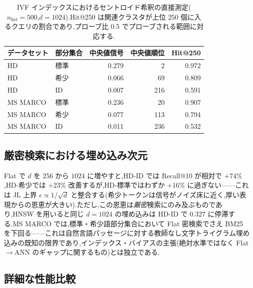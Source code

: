 \documentclass[conference]{IEEEtran}
\begin{document}
\begin{table}[t]
\centering
\small
\caption{IVF インデックスにおけるセントロイド希釈の直接測定($n_{\text{list}}{=}500$,$d{=}1024$).Hit@250 は関連クラスタが上位 $250$ 個に入るクエリの割合であり,プローブ比 $0.5$ でプローブされる範囲に対応する.}
\label{tab:centroid-stats}
\setlength{\tabcolsep}{4pt}
\begin{tabular}{llrrr}
\toprule
\textbf{データセット} & \textbf{部分集合} & \textbf{中央値信号} & \textbf{中央値順位} & \textbf{Hit@250} \\
\midrule
HD       & 標準   & 0.279 &   2 & 0.972 \\
HD       & 希少   & 0.066 &  69 & 0.809 \\
HD       & ID     & 0.007 & 216 & 0.591 \\
\midrule
MS MARCO & 標準   & 0.236 &  20 & 0.907 \\
MS MARCO & 希少   & 0.077 & 113 & 0.794 \\
MS MARCO & ID     & 0.011 & 236 & 0.532 \\
\bottomrule
\end{tabular}
\end{table}

\subsection{厳密検索における埋め込み次元}

Flat で $d$ を $256$ から $1024$ に増やすと,HD-ID では Recall@10 が相対で $+74\%$,HD-希少では $+23\%$ 改善するが,HD-標準ではわずか $+16\%$ に過ぎない——これは JL 上界 $\epsilon\!\propto\!1/\sqrt{d}$ と整合する(希少トークンは信号がノイズ床に近く,厚い表現からの恩恵が大きい).ただし,この恩恵は\emph{厳密}検索にのみ及ぶものであり,HNSW を用いると同じ $d{=}1024$ の埋め込みは HD-ID で $0.327$ に停滞する.MS MARCO では,標準・希少語部分集合において Flat 密検索でさえ BM25 を下回る——これは自然言語パッセージに対する教師なし文字トライグラム埋め込みの既知の限界であり,インデックス・バイアスの主張(絶対水準ではなく Flat$\to$ANN のギャップに関するもの)とは独立である.

\subsection{詳細な性能比較}
\end{document}
